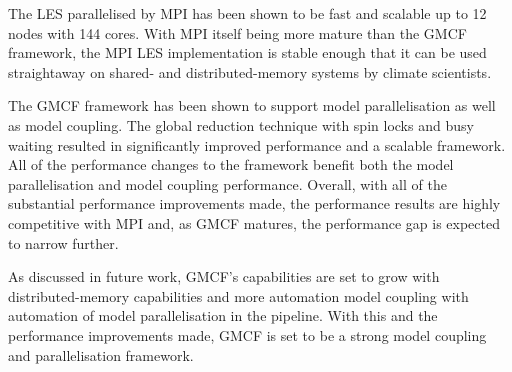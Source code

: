 The LES parallelised by MPI has been shown to be fast and scalable up to 12
nodes with 144 cores. With MPI itself being more mature than the GMCF framework,
the MPI LES implementation is stable enough that it can be used straightaway on
shared- and distributed-memory systems by climate scientists.

The GMCF framework has been shown to support model parallelisation as well as
model coupling. The global reduction technique with spin locks and busy waiting
resulted in significantly improved performance and a scalable framework. All of
the performance changes to the framework benefit both the model parallelisation
and model coupling performance. Overall, with all of the substantial performance
improvements made, the performance results are highly competitive with MPI and,
as GMCF matures, the performance gap is expected to narrow further.

As discussed in future work, GMCF's capabilities are set to grow with
distributed-memory capabilities and more automation model coupling with
automation of model parallelisation in the pipeline. With this and the
performance improvements made, GMCF is set to be a strong model coupling and
parallelisation framework.
